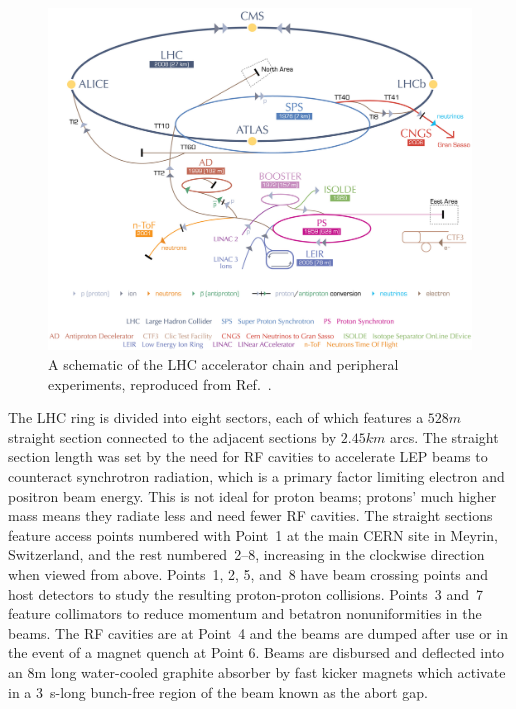 \begin{figure}[htbp]
  \centering
  \includegraphics[width=\textwidth]{experiment/acceleratorChain.png}
  \caption[LHC accelerator and experiment layout]{
    A schematic of the LHC accelerator chain and peripheral experiments, reproduced from Ref.~\cite{Christiane:1260465}.
  }\label{fig:acceleratorChain}
\end{figure}

The LHC ring is divided into eight sectors, each of which features a $528\unit{m}$ straight section connected to the adjacent sections by $2.45\unit{km}$ arcs.
The straight section length was set by the need for RF cavities to accelerate LEP beams to counteract synchrotron radiation, which is a primary factor limiting electron and positron beam energy.
This is not ideal for proton beams; protons' much higher mass means they radiate less and need fewer RF cavities.
The straight sections feature access points numbered with Point~1 at the main CERN site in Meyrin, Switzerland, and the rest numbered~2--8, increasing in the clockwise direction when viewed from above.
Points~1, 2, 5, and~8 have beam crossing points and host detectors to study the resulting proton-proton collisions.
Points~3 and~7 feature collimators to reduce momentum and betatron nonuniformities in the beams.
The RF cavities are at Point~4 and the beams are dumped after use or in the event of a magnet quench at Point 6\@.
Beams are disbursed and deflected into an 8\unit{m} long water-cooled graphite absorber by fast kicker magnets which activate in a 3\unit{\mu{} s}-long bunch-free region of the beam known as the abort gap.


